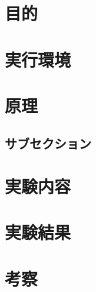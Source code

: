 \documentclass[12pt, dvipdfmx,autodetect-engine]{jsarticle}
\begin{document}


\section{目的}
\section{実行環境}
\section{原理}
\subsection{サブセクション}
\section{実験内容}
\section{実験結果}
\section{考察}
\newpage
\end{document}
